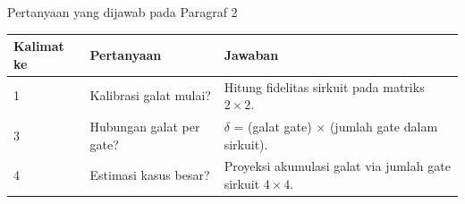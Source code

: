 \begin{frame}{Pertanyaan yang dijawab pada Paragraf 2}
    \centering
    \small
    \begin{tabular}{lp{4.5cm}p{6cm}}
        \toprule
        Kalimat ke & Pertanyaan & Jawaban \\
        \midrule
        1 & Kalibrasi galat mulai? & Hitung fidelitas sirkuit pada matriks $2 \times 2$. \\
        3 & Hubungan galat per gate? & $\delta$ = (galat gate) $\times$ (jumlah gate dalam sirkuit). \\
        4 & Estimasi kasus besar? & Proyeksi akumulasi galat via jumlah gate sirkuit $4 \times 4$. \\
        \bottomrule
    \end{tabular}
\end{frame}
